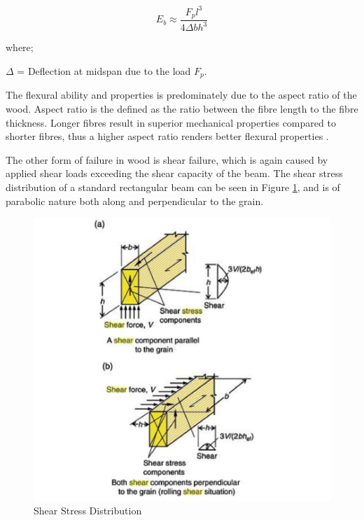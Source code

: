 \documentclass[11pt,a4paper]{article}
\numberwithin{equation}{subsection}
\begin{document}
   	 \begin{equation}
  E_{b} \approx \dfrac{F_{p} l^{3}}{4 \Delta bh^{3}}
   	 \end{equation}
   		
   	\noindent
   	where; \par
   	$ \Delta $ = Deflection at midspan due to the load $F_{p}$.\par
   	 
   	\vspace*{\baselineskip}
	 
	\noindent 
	 The flexural ability and properties is predominately due to the aspect ratio of the wood. Aspect ratio is the defined as the ratio between the fibre length to the fibre thickness. Longer fibres result in superior mechanical properties compared to shorter fibres, thus a higher aspect ratio renders better flexural properties \cite{klyosov_wood-plastic_2007}.  
	 
	 \vspace*{\baselineskip}
	 
	 \noindent
	 The other form of failure in wood is shear failure, which is again caused by applied shear loads exceeding the shear capacity of the beam. The shear stress distribution of a standard rectangular beam can be seen in Figure \ref{fig:Shear-Stress}, and is of parabolic nature both along and perpendicular to the grain.
	 
	\begin{figure}[h]
		\begin{center}
			\includegraphics[scale=0.7]{Shear_Stress}
		\end{center}
		\caption{Shear Stress Distribution \cite{porteous_structural_2013}}
		\label{fig:Shear-Stress}
	\end{figure} 
	
\end{document}

